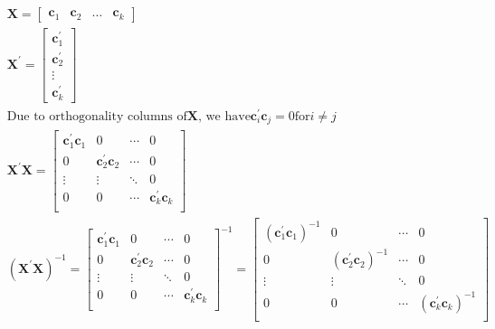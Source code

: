 \documentclass[11pt,reqno]{article}   %
\newcommand{\mlt}[1]{\mathbf{#1}} %
\newcommand{\kl}{\left(}
\newcommand{\kr}{\right)}
\newcommand{\kt}{^{\prime}}
\newcommand{\kX}{\mlt{X}}
\newcommand{\kc}{\mlt{c}}
\begin{document}
%
\begin{equation}
\begin{split} %
&\kX=\begin{bmatrix} \kc_1 & \kc_2 & \ldots & \kc_k\end{bmatrix} \\
&\kX\kt = \begin{bmatrix} \kc_1\kt \\ \kc_2\kt \\ \vdots \\ \kc_k\kt\end{bmatrix} \\
& \text{Due to orthogonality columns of} \kX \text{, we have} \kc_i\kt\kc_j=0 \text{for} i\neq j\\
&\kX\kt\kX = \begin{bmatrix}
\kc_1\kt\kc_1 & 0 & \cdots & 0 \\ 
0 & \kc_2\kt\kc_2 & \cdots & 0 \\ 
\vdots & \vdots & \ddots & 0 \\ 
0 & 0 & \cdots & \kc_k\kt\kc_k \\ 
\end{bmatrix} \\
&\kl \kX\kt\kX \kr^{-1} = \begin{bmatrix}
\kc_1\kt\kc_1 & 0 & \cdots & 0 \\ 
0 & \kc_2\kt\kc_2 & \cdots & 0 \\ 
\vdots & \vdots & \ddots & 0 \\ 
0 & 0 & \cdots & \kc_k\kt\kc_k \\ 
\end{bmatrix}^{-1} =
\begin{bmatrix}
(\kc_1\kt\kc_1)^{-1} & 0 & \cdots & 0 \\ 
0 & (\kc_2\kt\kc_2)^{-1} & \cdots & 0 \\ 
\vdots & \vdots & \ddots & 0 \\ 
0 & 0 & \cdots & (\kc_k\kt\kc_k)^{-1} \\ 
\end{bmatrix} \\
\end{split}
\end{equation}
\end{document}
